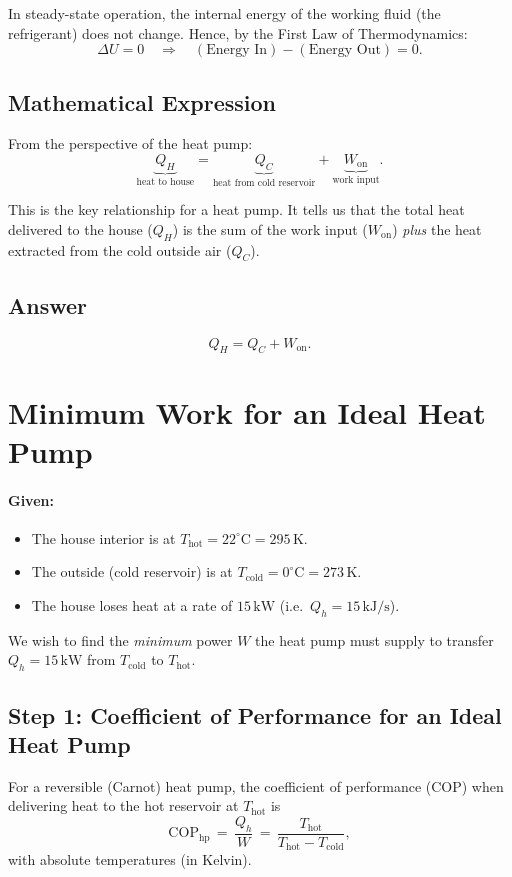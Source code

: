 \documentclass[12pt]{article}
\theoremstyle{definition} %
\theoremstyle{plain} %
\begin{document}
In steady-state operation, the internal energy of the working fluid (the refrigerant) does not change. Hence, by the First Law of Thermodynamics:
\[
\Delta U = 0 
\quad \Longrightarrow \quad 
(\text{Energy In}) - (\text{Energy Out}) = 0.
\]

\subsection*{Mathematical Expression}

From the perspective of the heat pump:
\[
\underbrace{Q_H}_{\text{heat to house}} 
= \underbrace{Q_C}_{\text{heat from cold reservoir}}
+ \underbrace{W_{\text{on}}}_{\text{work input}}.
\]

This is the key relationship for a heat pump.  
It tells us that the total heat delivered to the house ($Q_H$) is the sum of the work input ($W_{\text{on}}$) \emph{plus} the heat extracted from the cold outside air ($Q_C$).

\subsection*{Answer}

\[
\boxed{ Q_H = Q_C + W_{\text{on}} }.
\]
\section*{Minimum Work for an Ideal Heat Pump}

\paragraph{Given:}
\begin{itemize}
  \item The house interior is at $T_{\text{hot}} = 22^\circ\mathrm{C} = 295\,\mathrm{K}$.
  \item The outside (cold reservoir) is at $T_{\text{cold}} = 0^\circ\mathrm{C} = 273\,\mathrm{K}$.
  \item The house loses heat at a rate of $15\,\mathrm{kW}$ (i.e.\ $Q_h = 15\,\mathrm{kJ/s}$).
\end{itemize}
We wish to find the \emph{minimum} power $W$ the heat pump must supply to transfer $Q_h=15\,\mathrm{kW}$ from $T_{\text{cold}}$ to $T_{\text{hot}}$.  

\subsection*{Step 1: Coefficient of Performance for an Ideal Heat Pump}
For a reversible (Carnot) heat pump, the coefficient of performance (COP) when delivering heat to the hot reservoir at $T_{\text{hot}}$ is
\[
\mathrm{COP}_{\text{hp}}
\,=\, \frac{Q_h}{W}
\,=\, \frac{T_{\text{hot}}}{T_{\text{hot}} - T_{\text{cold}}},
\]
with absolute temperatures (in Kelvin).
\end{document}
